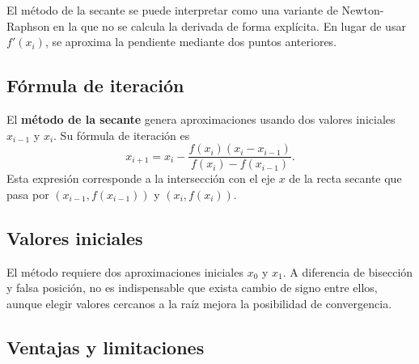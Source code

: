 \documentclass[a4,11pt]{aleph-notas}
\begin{document}
El método de la secante se puede interpretar como una variante de Newton-Raphson en la que no se calcula la derivada de forma explícita. En lugar de usar $f'(x_i)$, se aproxima la pendiente mediante dos puntos anteriores.

\subsection{Fórmula de iteración}

\begin{defi}
    El \textbf{método de la secante} genera aproximaciones usando dos valores iniciales $x_{i-1}$ y $x_i$. Su fórmula de iteración es
    \[
        x_{i+1}
        =
        x_i-\frac{f(x_i)(x_i-x_{i-1})}{f(x_i)-f(x_{i-1})}.
    \]
    Esta expresión corresponde a la intersección con el eje $x$ de la recta secante que pasa por $(x_{i-1},f(x_{i-1}))$ y $(x_i,f(x_i))$.
\end{defi}

\begin{pscodigo}
\begin{function}[H]
\end{function}
\end{pscodigo}

\subsection{Valores iniciales}

El método requiere dos aproximaciones iniciales $x_0$ y $x_1$. A diferencia de bisección y falsa posición, no es indispensable que exista cambio de signo entre ellos, aunque elegir valores cercanos a la raíz mejora la posibilidad de convergencia.


\subsection{Ventajas y limitaciones}
\end{document}
